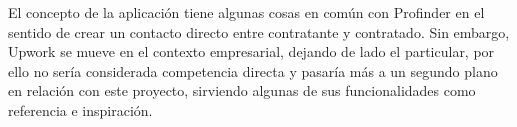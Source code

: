 El concepto de la aplicación tiene algunas cosas en común con Profinder en el sentido de crear un contacto directo entre contratante y contratado. Sin embargo, Upwork se mueve en el contexto empresarial, dejando de lado el particular, por ello no sería considerada competencia directa y pasaría más a un segundo plano en relación con este proyecto, sirviendo algunas de sus funcionalidades como referencia e inspiración.







